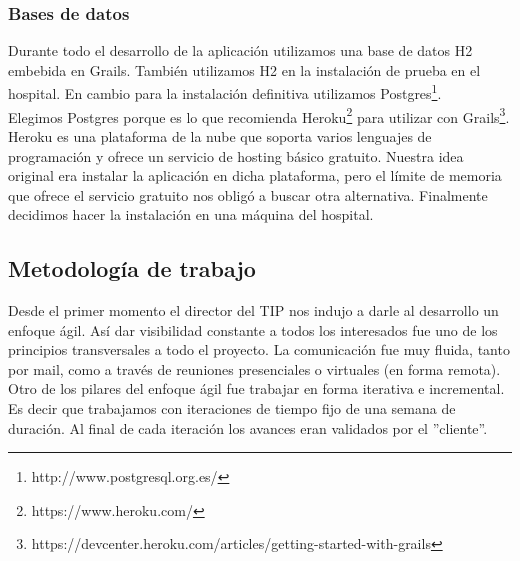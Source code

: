 \subsubsection{Bases de datos}
Durante todo el desarrollo de la aplicación utilizamos una base de datos H2 embebida en Grails. También utilizamos H2 en la instalación de prueba en el hospital. En cambio para la instalación definitiva utilizamos Postgres\footnote{http://www.postgresql.org.es/}.\\
Elegimos Postgres porque es lo que recomienda Heroku\footnote{https://www.heroku.com/} para utilizar con Grails\footnote{https://devcenter.heroku.com/articles/getting-started-with-grails}. Heroku es una plataforma de la nube que soporta varios lenguajes de programación y ofrece un servicio de hosting básico gratuito. Nuestra idea original era instalar la aplicación en dicha plataforma, pero el límite de memoria que ofrece el servicio gratuito nos obligó a buscar otra alternativa. Finalmente decidimos hacer la instalación en una máquina del hospital.
\subsection{Metodología de trabajo}
Desde el primer momento el director del TIP nos indujo a darle al desarrollo un enfoque ágil\cite{Shore}. Así dar visibilidad constante a todos los interesados fue uno de los principios transversales a todo el proyecto. La comunicación fue muy fluida, tanto por mail, como a través de reuniones presenciales o virtuales (en forma remota). Otro de los pilares del enfoque ágil fue trabajar en forma iterativa e incremental. Es decir que trabajamos con iteraciones de tiempo fijo de una semana de duración. Al final de cada iteración los avances eran validados por el ''cliente''.
